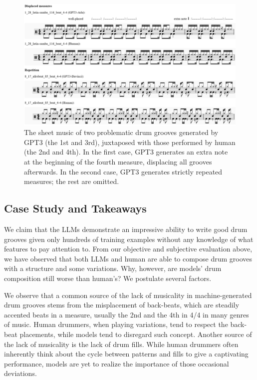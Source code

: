 \documentclass[letterpaper]{article} %
\begin{document}
\begin{figure}
\centering
\includegraphics[scale=0.48]{images/bad_example.png}
\caption{The sheet music of two problematic drum grooves generated by GPT3 (the 1st and 3rd), juxtaposed with those performed by human (the 2nd and 4th). In the first case, GPT3 generates an extra note at the beginning of the fourth measure, displacing all grooves afterwards. In the second case, GPT3 generates strictly repeated measures; the rest are omitted.}
\label{fig:bad_example}
\end{figure}

\subsection{Case Study and Takeaways}
We claim that the LLMs demonstrate an impressive ability to write good drum grooves given only hundreds of training examples without any knowledge of what features to pay attention to. From our objective and subjective evaluation above, we have observed that both LLMs and human are able to compose drum grooves with a structure and some variations. Why, however, are models' drum composition still worse than human's? We postulate several factors.

We observe that a common source of the lack of musicality in machine-generated drum grooves stems from the misplacement of back-beats, which are steadily accented beats in a measure, usually the 2nd and the 4th in 4/4 in many genres of music. Human drummers, when playing variations, tend to respect the back-beat placements, while models tend to disregard such concept. Another source of the lack of musicality is the lack of drum fills. While human drummers often inherently think about the cycle between patterns and fills to give a captivating performance, models are yet to realize the importance of those occasional deviations.
\end{document}
